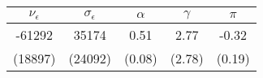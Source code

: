 \begin{tabular}{ccccc}\toprule$\nu_{\epsilon}$ & $\sigma_{\epsilon}$ & $\alpha$ & $\gamma$ & $\pi$ \\ \midrule -61292 &  35174 & 0.51 &  2.77 & -0.32 \\(18897) & (24092) & (0.08) & (2.78) & (0.19)\\\bottomrule\end{tabular}